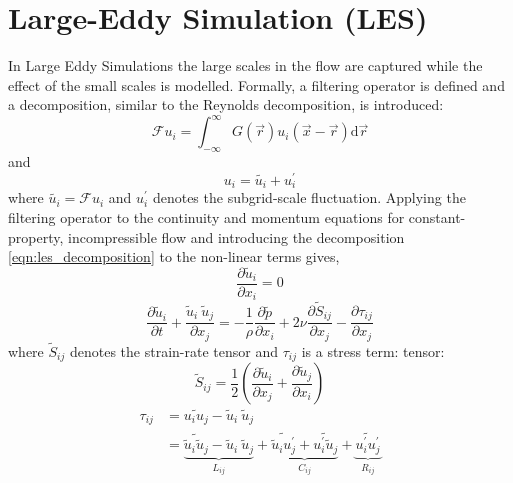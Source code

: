\section{Large-Eddy Simulation (LES)}
In Large Eddy Simulations the large scales in the ﬂow are captured while the effect of the small scales
is modelled. Formally, a filtering operator is defined and a decomposition, similar to the Reynolds
decomposition, is introduced:
\begin{equation}
\mathcal{F}u_i = \int_{-\infty}^\infty G\left( \overrightarrow{r} \right) u_i\left( \overrightarrow{x} - \overrightarrow{r} \right) \text{d} \overrightarrow{r}
\label{eqn:les_filtering}
\end{equation}
and
\begin{equation}
u_i = \tilde{u_i} + u_i^\prime
\label{eqn:les_decomposition}
\end{equation}
where $\tilde{u_i} = \mathcal{F}u_i$ and $u_i^\prime$ denotes the subgrid-scale fluctuation. Applying
the filtering operator to the continuity and momentum equations for constant-property, incompressible
flow and introducing the decomposition \eqref{eqn:les_decomposition} to the non-linear terms gives,
\begin{equation}
\frac{\partial \tilde{u}_i}{\partial x_i} = 0
\end{equation}
\begin{equation}
\frac{\partial \tilde{u}_i}{\partial t} + \frac{\tilde{u}_i \ \tilde{u}_j}{\partial x_j} =
 -\frac 1 \rho \frac{\partial \tilde p}{\partial x_i}
 + 2 \nu \frac{\partial \tilde S_{ij}}{\partial x_j} - \frac{\partial \tau_{ij}}{\partial x_j}
\end{equation}
where $\tilde S_{ij}$ denotes the strain-rate tensor and $\tau_{ij}$ is a stress term:
tensor:
\begin{equation}
\tilde S_{ij} = \frac 1 2 \left ( \frac{\partial \tilde u_i}{\partial x_j} + \frac{\partial \tilde u_j}{\partial x_i} \right )
\label{eqn:defin_strain_rate_tensor}
\end{equation}
\begin{align}
\tau_{ij} &= \widetilde{u_i u_j} - \tilde u_i \ \tilde u_j \nonumber \\
          &= \underbrace{\widetilde{ \tilde u_i \tilde u_j} - \tilde u_i \ \tilde u_j}_{L_{ij}} + \underbrace{\widetilde{\tilde{u}_i u_j^\prime} + \widetilde{u_i^\prime \tilde{u}_j}}_{C_{ij}} + \underbrace{\widetilde{u_i^\prime u_j^\prime}}_{R_{ij}}
\label{eqn:defin_sgs_stress_tensor}
\end{align}
